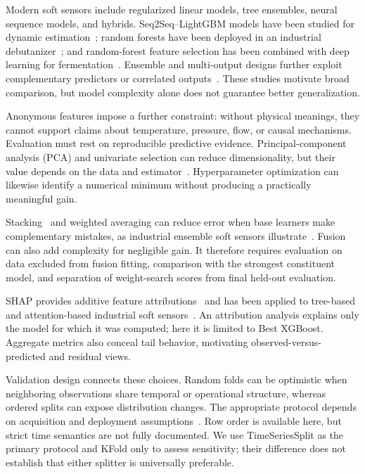 \documentclass[sigconf,screen,review,anonymous]{acmart}
\begin{document}
Modern soft sensors include regularized linear models, tree ensembles, neural sequence models, and hybrids. Seq2Seq--LightGBM models have been studied for dynamic estimation~\cite{li2020seq2seq_lightgbm}; random forests have been deployed in an industrial debutanizer~\cite{botha2021industrial_softsensor}; and random-forest feature selection has been combined with deep learning for fermentation~\cite{hua2023rf_feature_selection}. Ensemble and multi-output designs further exploit complementary predictors or correlated outputs~\cite{wang2019two_layer_ensemble,pan2019ensemble_jit,wan2024wide_rf}. These studies motivate broad comparison, but model complexity alone does not guarantee better generalization.

Anonymous features impose a further constraint: without physical meanings, they cannot support claims about temperature, pressure, flow, or causal mechanisms. Evaluation must rest on reproducible predictive evidence. Principal-component analysis (PCA) and univariate selection can reduce dimensionality, but their value depends on the data and estimator~\cite{jolliffe2016pca,guyon2003feature_selection}. Hyperparameter optimization can likewise identify a numerical minimum without producing a practically meaningful gain.

Stacking~\cite{wolpert1992stacking} and weighted averaging can reduce error when base learners make complementary mistakes, as industrial ensemble soft sensors illustrate~\cite{wang2019two_layer_ensemble,pan2019ensemble_jit}. Fusion can also add complexity for negligible gain. It therefore requires evaluation on data excluded from fusion fitting, comparison with the strongest constituent model, and separation of weight-search scores from final held-out evaluation.

SHAP provides additive feature attributions~\cite{lundberg2017shap} and has been applied to tree-based and attention-based industrial soft sensors~\cite{cao2023interpretable_softsensor,cao2024informer_shap}. An attribution analysis explains only the model for which it was computed; here it is limited to Best XGBoost. Aggregate metrics also conceal tail behavior, motivating observed-versus-predicted and residual views.

Validation design connects these choices. Random folds can be optimistic when neighboring observations share temporal or operational structure, whereas ordered splits can expose distribution changes. The appropriate protocol depends on acquisition and deployment assumptions~\cite{bergmeir2012cv,bergmeir2018cv}. Row order is available here, but strict time semantics are not fully documented. We use TimeSeriesSplit as the primary protocol and KFold only to assess sensitivity; their difference does not establish that either splitter is universally preferable.
\end{document}
